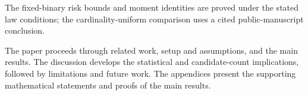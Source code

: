 The fixed-binary risk bounds and moment identities are proved under the stated law conditions; the cardinality-uniform comparison uses a cited public-manuscript conclusion.

The paper proceeds through related work, setup and assumptions, and the main results. The discussion develops the statistical and candidate-count implications, followed by limitations and future work. The appendices present the supporting mathematical statements and proofs of the main results.

